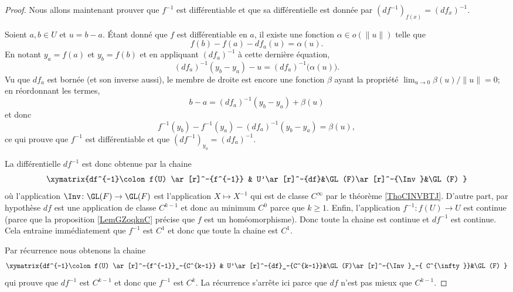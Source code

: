 \begin{proof}
    Nous allons maintenant prouver que \( f^{-1}\) est différentiable et que sa différentielle est donnée par \( (df^{-1})_{f(x)}=(df_x)^{-1}\).

    Soient \( a,b\in U\) et \( u=b-a\). Étant donné que \( f\) est différentiable en \( a\), il existe une fonction \( \alpha\in o(\| u \|)\) telle que
    \begin{equation}
        f(b)-f(a)-df_a(u)=\alpha(u).
    \end{equation}
    En notant \( y_a=f(a)\) et \( y_b=f(b)\) et en appliquant \( (df_a)^{-1}\) à cette dernière équation,
    \begin{equation}
        (df_a)^{-1}(y_b-y_a)-u=(df_a)^{-1} \big( \alpha(u) \big).
    \end{equation}
    Vu que \( df_a\) est bornée (et son inverse aussi), le membre de droite est encore une fonction \( \beta\) ayant la propriété \( \lim_{u\to 0}\beta(u)/\| u \|=0\); en réordonnant les termes,
    \begin{equation}
        b-a=(df_a)^{-1}(y_b-y_a)+\beta(u)
    \end{equation}
    et donc
    \begin{equation}
        f^{-1}(y_b)-f^{-1}(y_a)-(df_a)^{-1}(y_b-y_a)=\beta(u),
    \end{equation}
    ce qui prouve que \( f^{-1}\) est différentiable et que \( (df^{-1})_{y_a}=(df_a)^{-1}\).

    La différentielle \( df^{-1}\) est donc obtenue par la chaine
    \begin{equation}
    \xymatrix{%
        df^{-1}\colon f(U) \ar[r]^-{f^{-1}}     &   U'\ar[r]^-{df}&\GL(F)\ar[r]^-{\Inv}&\GL(F)
       }
    \end{equation}
    où l'application \( \Inv\colon \GL(F)\to \GL(F)\) est l'application \( X\mapsto X^{-1}\) qui est de classe \(  C^{\infty}\) par le théorème \ref{ThoCINVBTJ}. D'autre part, par hypothèse \( df\) est une application de classe \( C^{k-1}\) et donc au minimum \( C^0\) parce que \( k\geq 1\). Enfin, l'application \( f^{-1}\colon f(U)\to U\) est continue (parce que la proposition \ref{LemGZoqknC} précise que \( f\) est un homéomorphisme). Donc toute la chaine est continue et \( df^{-1}\) est continue. Cela entraine immédiatement que \( f^{-1}\) est \( C^1\) et donc que toute la chaine est \( C^1\).

    Par récurrence nous obtenons la chaine
    \begin{equation}
    \xymatrix{%
        df^{-1}\colon f(U) \ar[r]^-{f^{-1}}_-{C^{k-1}}     &   U'\ar[r]^-{df}_-{C^{k-1}}&\GL(F)\ar[r]^-{\Inv}_-{ C^{\infty}}&\GL(F)
       }
    \end{equation}
    qui prouve que \( df^{-1}\) est \( C^{k-1} \) et donc que \( f^{-1}\) est \( C^k\). La récurrence s'arrête ici parce que \( df\) n'est pas mieux que \( C^{k-1}\).
\end{proof}

